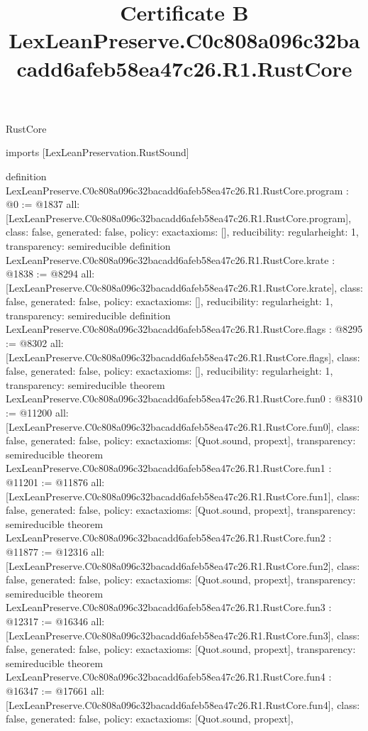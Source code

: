 \begin{lexlean}{RustCore}
\title{Certificate B LexLeanPreserve.C0c808a096c32bacadd6afeb58ea47c26.R1.RustCore}
\begin{coremodule}
imports [LexLeanPreservation.RustSound]

definition LexLeanPreserve.C0c808a096c32bacadd6afeb58ea47c26.R1.RustCore.program : @0 := @1837 {
  all: [LexLeanPreserve.C0c808a096c32bacadd6afeb58ea47c26.R1.RustCore.program],
  class: false,
  generated: false,
  policy: exact{axioms: []},
  reducibility: regular{height: 1},
  transparency: semireducible
}
definition LexLeanPreserve.C0c808a096c32bacadd6afeb58ea47c26.R1.RustCore.krate : @1838 := @8294 {
  all: [LexLeanPreserve.C0c808a096c32bacadd6afeb58ea47c26.R1.RustCore.krate],
  class: false,
  generated: false,
  policy: exact{axioms: []},
  reducibility: regular{height: 1},
  transparency: semireducible
}
definition LexLeanPreserve.C0c808a096c32bacadd6afeb58ea47c26.R1.RustCore.flags : @8295 := @8302 {
  all: [LexLeanPreserve.C0c808a096c32bacadd6afeb58ea47c26.R1.RustCore.flags],
  class: false,
  generated: false,
  policy: exact{axioms: []},
  reducibility: regular{height: 1},
  transparency: semireducible
}
theorem LexLeanPreserve.C0c808a096c32bacadd6afeb58ea47c26.R1.RustCore.fun0 : @8310 := @11200 {
  all: [LexLeanPreserve.C0c808a096c32bacadd6afeb58ea47c26.R1.RustCore.fun0],
  class: false,
  generated: false,
  policy: exact{axioms: [Quot.sound, propext]},
  transparency: semireducible
}
theorem LexLeanPreserve.C0c808a096c32bacadd6afeb58ea47c26.R1.RustCore.fun1 : @11201 := @11876 {
  all: [LexLeanPreserve.C0c808a096c32bacadd6afeb58ea47c26.R1.RustCore.fun1],
  class: false,
  generated: false,
  policy: exact{axioms: [Quot.sound, propext]},
  transparency: semireducible
}
theorem LexLeanPreserve.C0c808a096c32bacadd6afeb58ea47c26.R1.RustCore.fun2 : @11877 := @12316 {
  all: [LexLeanPreserve.C0c808a096c32bacadd6afeb58ea47c26.R1.RustCore.fun2],
  class: false,
  generated: false,
  policy: exact{axioms: [Quot.sound, propext]},
  transparency: semireducible
}
theorem LexLeanPreserve.C0c808a096c32bacadd6afeb58ea47c26.R1.RustCore.fun3 : @12317 := @16346 {
  all: [LexLeanPreserve.C0c808a096c32bacadd6afeb58ea47c26.R1.RustCore.fun3],
  class: false,
  generated: false,
  policy: exact{axioms: [Quot.sound, propext]},
  transparency: semireducible
}
theorem LexLeanPreserve.C0c808a096c32bacadd6afeb58ea47c26.R1.RustCore.fun4 : @16347 := @17661 {
  all: [LexLeanPreserve.C0c808a096c32bacadd6afeb58ea47c26.R1.RustCore.fun4],
  class: false,
  generated: false,
  policy: exact{axioms: [Quot.sound, propext]},
}
\end{coremodule}
\end{lexlean}
